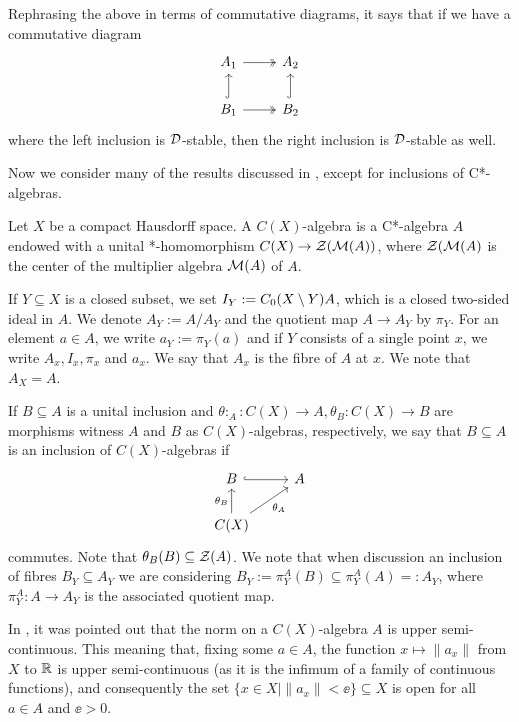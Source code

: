 \documentclass[12pt]{amsart}
\begin{document}
Rephrasing the above in terms of commutative diagrams, it says that if we have a commutative diagram
\begin{equation}
\begin{tikzcd}
A_1 \arrow[r, two heads]                 & A_2                 \\
B_1 \arrow[r, two heads] \arrow[u, hook] & B_2 \arrow[u, hook]
\end{tikzcd}
\end{equation}
where the left inclusion is $\mathcal{D}$-stable, then the right inclusion is $\mathcal{D}$-stable as well. 

Now we consider many of the results discussed in \cite[Section 4]{HirshbergRordamWinter07}, except for inclusions of C*-algebras.

\begin{defn}
      Let $X$ be a compact Hausdorff space. A $C(X)$-algebra is a C*-algebra $A$ endowed with a unital *-homomorphism $C(X) \to \mathcal{Z}(\mathcal{M}(A))$, where $\mathcal{Z}(\mathcal{M}(A)$ is the center of the multiplier algebra $\mathcal{M}(A)$ of $A$. 
    \end{defn}

    If $Y \subseteq X$ is a closed subset, we set $I_Y := C_0(X \setminus Y)A$, which is a closed two-sided ideal in $A$. We denote $A_Y := A/A_Y$ and the quotient map  $A \to A_Y$ by $\pi_Y$. For an element $a \in A$, we write $a_Y := \pi_Y(a)$ and if $Y$ consists of a single point $x$, we write $A_x,I_x,\pi_x$ and $a_x$. We say that $A_x$ is the fibre of $A$ at $x$. We note that $A_X = A$.
    
    If $B \subseteq A$ is a unital inclusion and $\theta:_A: C(X) \to A, \theta_B: C(X) \to B$ are morphisms witness $A$ and $B$ as $C(X)$-algebras, respectively, we say that $B \subseteq A$ is an inclusion of $C(X)$-algebras if
    \begin{equation}
    \begin{tikzcd}
B \arrow[r, hook]                                  & A \\
C(X) \arrow[u, "\theta_B"] \arrow[ru, "\theta_A"'] &  
\end{tikzcd}
    \end{equation}
    commutes. Note that $\theta_B(B) \subseteq \mathcal{Z}(A)$. We note that when discussion an inclusion of fibres $B_Y \subseteq A_Y$ we are considering $B_Y := \pi^A_Y(B) \subseteq \pi^A_Y(A) =: A_Y$, where $\pi_Y^A: A \to A_Y$ is the associated quotient map. 
   
    
  \begin{remark}\label{rem:up-semi-cts}
  In \cite[Section 1.3]{HirshbergRordamWinter07}, it was pointed out that the norm on a $C(X)$-algebra $A$ is upper semi-continuous. This meaning that, fixing some $a \in A$, the function $x \mapsto \|a_x\|$ from $X$ to $\mathbb{R}$ is upper semi-continuous (as it is the infimum of a family of continuous functions), and consequently the set $\{x \in X \mid \|a_x\| < \ee\} \subseteq X$ is open for all $a \in A$ and $\ee > 0$. 
  \end{remark}
  
\end{document}
